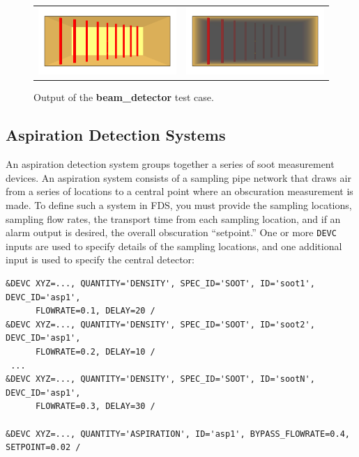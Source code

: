 \documentclass[11pt]{book}
\newcommand{\ct}{\tt\small}
\begin{document}
\begin{figure}[ht]
\begin{tabular*}{\textwidth}{lr}
\includegraphics[width=3.2in]{SCRIPT_FIGURES/beam_detector_nosmoke} &
\includegraphics[width=3.2in]{SCRIPT_FIGURES/beam_detector_smoke}
\end{tabular*}
\caption[Example of a beam detector.]{Output of the {\bf beam\_detector} test case.}
\label{beam_detector}
\end{figure}




\subsection{Aspiration Detection Systems}
\label{info:aspiration_detector}

An aspiration detection system groups together a series of soot measurement devices.
An aspiration system consists of a sampling pipe network that draws air from a series of locations to a central point
where an obscuration measurement is made.  To define such a system in FDS, you must provide the sampling locations,
sampling flow rates, the transport time from each sampling location, and if an alarm output is desired, the overall obscuration
``setpoint.''  One or more {\ct DEVC} inputs are used to specify details of the sampling locations, and one additional input is
used to specify the central detector:

\footnotesize
\begin{verbatim}
&DEVC XYZ=..., QUANTITY='DENSITY', SPEC_ID='SOOT', ID='soot1', DEVC_ID='asp1',
      FLOWRATE=0.1, DELAY=20 /
&DEVC XYZ=..., QUANTITY='DENSITY', SPEC_ID='SOOT', ID='soot2', DEVC_ID='asp1',
      FLOWRATE=0.2, DELAY=10 /
 ...
&DEVC XYZ=..., QUANTITY='DENSITY', SPEC_ID='SOOT', ID='sootN', DEVC_ID='asp1',
      FLOWRATE=0.3, DELAY=30 /

&DEVC XYZ=..., QUANTITY='ASPIRATION', ID='asp1', BYPASS_FLOWRATE=0.4, SETPOINT=0.02 /
\end{verbatim}
\normalsize
\end{document}
